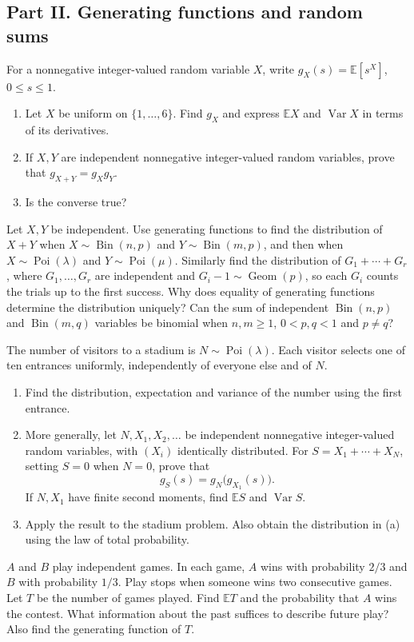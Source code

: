 \documentclass[11pt,a4paper]{article}
\newenvironment{enumeratea}{\begin{enumerate}[label=(\alph*),itemsep=0.28em,topsep=0.25em]}{\end{enumerate}}
\newcommand{\Ebb}{\mathbb E}
\newcommand{\Var}{\operatorname{Var}}
\newcommand{\Bin}{\operatorname{Bin}}
\newcommand{\Poi}{\operatorname{Poi}}
\newcommand{\Geom}{\operatorname{Geom}}
\newcounter{problem}[section]
\begin{document}
\subsection*{Part II. Generating functions and random sums}
\begin{problempencil}[Test 1, CS 2024]
For a nonnegative integer-valued random variable $X$, write $g_X(s)=\Ebb[s^X]$, $0\le s\le1$.
\begin{enumeratea}
  \item Let $X$ be uniform on $\{1,\ldots,6\}$. Find $g_X$ and express
  $\Ebb X$ and $\Var X$ in terms of its derivatives.
  \item If $X,Y$ are independent nonnegative integer-valued random variables,
  prove that $g_{X+Y}=g_Xg_Y$.
  \item[$(\mathrm{c})^\star$] Is the converse true?
\end{enumeratea}
\end{problempencil}
\begin{problembook}
Let $X,Y$ be independent. Use generating functions to find the distribution of
$X+Y$ when $X\sim\Bin(n,p)$ and $Y\sim\Bin(m,p)$, and then when
$X\sim\Poi(\lambda)$ and $Y\sim\Poi(\mu)$. Similarly find the distribution of
$G_1+\cdots+G_r$, where $G_1,\ldots,G_r$ are independent and $G_i-1\sim\Geom(p)$,
so each $G_i$ counts the trials up to the first success. Why does equality of
generating functions determine the distribution uniquely? Can the sum of independent
$\Bin(n,p)$ and $\Bin(m,q)$ variables be binomial when $n,m\ge1$, $0<p,q<1$ and $p\ne q$?
\end{problembook}
\begin{problempencil}
The number of visitors to a stadium is $N\sim\Poi(\lambda)$. Each visitor selects
one of ten entrances uniformly, independently of everyone else and of $N$.
\begin{enumeratea}
  \item Find the distribution, expectation and variance of the number using the first entrance.
  \item More generally, let $N,X_1,X_2,\ldots$ be independent nonnegative
  integer-valued random variables, with $(X_i)$ identically distributed.
  For $S=X_1+\cdots+X_N$, setting $S=0$ when $N=0$, prove that
  \[ g_S(s)=g_N\bigl(g_{X_1}(s)\bigr). \]
  If $N,X_1$ have finite second moments, find $\Ebb S$ and $\Var S$.
  \item Apply the result to the stadium problem. Also obtain the distribution
  in (a) using the law of total probability.
\end{enumeratea}
\end{problempencil}
\begin{problembook}
$A$ and $B$ play independent games. In each game, $A$ wins with probability $2/3$
and $B$ with probability $1/3$. Play stops when someone wins two consecutive games.
Let $T$ be the number of games played. Find $\Ebb T$ and the probability that
$A$ wins the contest. What information about the past suffices to describe future
play? Also find the generating function of $T$.
\end{problembook}
\end{document}
